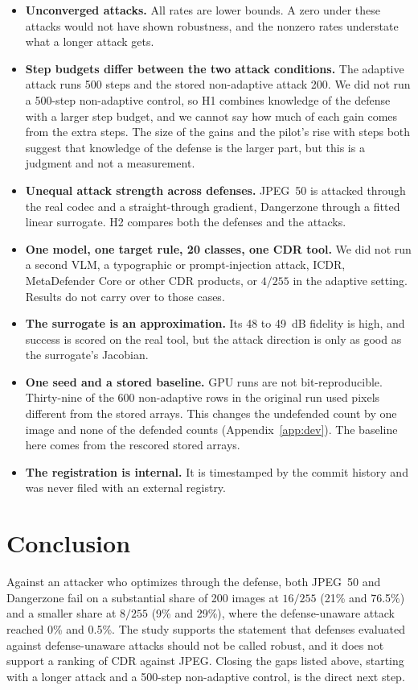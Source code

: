\documentclass[11pt]{article}
\begin{document}
\begin{itemize}
\item \textbf{Unconverged attacks.} All rates are lower bounds. A zero under these attacks
would not have shown robustness, and the nonzero rates understate what a longer attack gets.
\item \textbf{Step budgets differ between the two attack conditions.} The adaptive attack
runs 500 steps and the stored non-adaptive attack 200. We did not run a 500-step
non-adaptive control, so H1 combines knowledge of the defense with a larger step budget, and
we cannot say how much of each gain comes from the extra steps. The size of the gains and the
pilot's rise with steps both suggest that knowledge of the defense is the larger part, but
this is a judgment and not a measurement.
\item \textbf{Unequal attack strength across defenses.} JPEG~50 is attacked through the real
codec and a straight-through gradient, Dangerzone through a fitted linear surrogate. H2
compares both the defenses and the attacks.
\item \textbf{One model, one target rule, 20 classes, one CDR tool.} We did not run a second
VLM, a typographic or prompt-injection attack, ICDR, MetaDefender Core or other CDR products,
or $4/255$ in the adaptive setting. Results do not carry over to those cases.
\item \textbf{The surrogate is an approximation.} Its 48 to 49~dB fidelity is high, and
success is scored on the real tool, but the attack direction is only as good as the
surrogate's Jacobian.
\item \textbf{One seed and a stored baseline.} GPU runs are not bit-reproducible. Thirty-nine
of the 600 non-adaptive rows in the original run used pixels different from the stored
arrays. This changes the undefended count by one image and none of the defended counts
(Appendix~\ref{app:dev}). The baseline here comes from the rescored stored arrays.
\item \textbf{The registration is internal.} It is timestamped by the commit history and was
never filed with an external registry.
\end{itemize}

\section{Conclusion}

Against an attacker who optimizes through the defense, both JPEG~50 and Dangerzone fail on a
substantial share of 200 images at $16/255$ (21\% and 76.5\%) and a smaller share at $8/255$
(9\% and 29\%), where the defense-unaware attack reached 0\% and 0.5\%. The study supports
the statement that defenses evaluated against defense-unaware attacks should not be called
robust, and it does not support a ranking of CDR against JPEG. Closing the gaps listed above,
starting with a longer attack and a 500-step non-adaptive control, is the direct next step.
\end{document}
